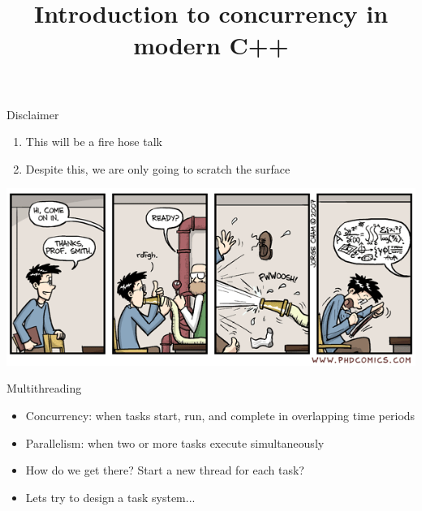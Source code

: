\documentclass{beamer}
\title{Introduction to concurrency in modern C++}
\date{\vspace{5pt}\formatdate{13}{1}{2021}}
\begin{document}
\maketitle


\begin{frame}{Disclaimer}
\begin{enumerate}
\item This will be a fire hose talk
\item Despite this, we are only going to scratch the surface
\end{enumerate}
\includegraphics[width=\linewidth]{firehose.png}
\end{frame}

\begin{frame}{Multithreading}
\begin{itemize}
\item Concurrency: when tasks start, run, and complete in overlapping time periods
\item Parallelism: when two or more tasks execute simultaneously
\item How do we get there? Start a new thread for each task?
\item Lets try to design a task system...
\end{itemize}
\end{frame}
\end{document}
